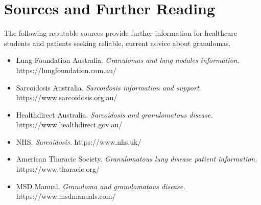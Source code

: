 \section*{Sources and Further Reading}
The following reputable sources provide further information for healthcare students and patients seeking reliable, current advice about granulomas.

\begin{itemize}
    \item Lung Foundation Australia. \textit{Granulomas and lung nodules information.} https://lungfoundation.com.au/
    \item Sarcoidosis Australia. \textit{Sarcoidosis information and support.} https://www.sarcoidosis.org.au/
    \item Healthdirect Australia. \textit{Sarcoidosis and granulomatous disease.} https://www.healthdirect.gov.au/
    \item NHS. \textit{Sarcoidosis.} https://www.nhs.uk/
    \item American Thoracic Society. \textit{Granulomatous lung disease patient information.} https://www.thoracic.org/
    \item MSD Manual. \textit{Granuloma and granulomatous disease.} https://www.msdmanuals.com/
\end{itemize}
